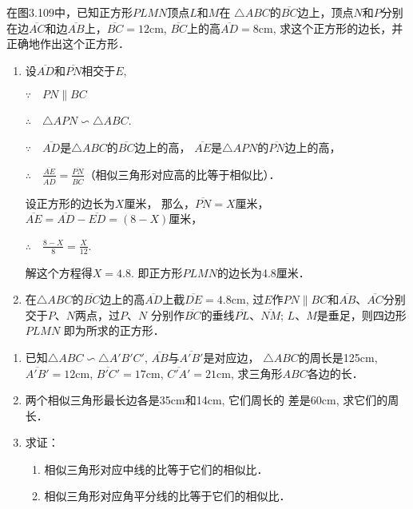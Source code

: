 \begin{example}
    在图3.109中，已知正方形$PLMN$顶点$L$和$M$在
    $\triangle ABC$的$\overline{BC}$边上，顶点$N$和$P$分别在边$\overline{AC}$和边$\overline{AB}$上，$\overline{BC}=12$cm, $\overline{BC}$上的高$\overline{AD}=8$cm, 
    求这个正方形的边长，并正确地作出这个正方形．
\end{example}

\begin{solution}
\begin{enumerate}
    \item 设$\overline{AD}$和$\overline{PN}$相交于$E$,

$\because\quad PN\parallel BC$

$\therefore\quad \triangle APN\backsim \triangle ABC$.

$\because\quad \overline{AD}$是$\triangle ABC$的$\overline{BC}$边上的高，
$\overline{AE}$是$\triangle APN$的$\overline{PN}$边上的高，

$\therefore\quad \frac{\overline{AE}}{\overline{AD}}=\frac{\overline{PN}}{\overline{BC}}$（相似三角形对应高的比等于相似比）．

设正方形的边长为$X$厘米，
那么，$\overline{PN}=X$厘米，$\overline{AE}=\overline{AD}-\overline{ED}=(8-X)$厘米，

$\therefore\quad \frac{8-X}{8}=\frac{X}{12}$.

解这个方程得$X=4.8$. 即正方形$PLMN$的边长为4.8厘米．
\item 在$\triangle ABC$的$\overline{BC}$边上的高$\overline{AD}$上截$\overline{DE}=4.8$cm, 
过$E$作$PN\parallel BC$和$\overline{AB}$、$\overline{AC}$分别交于$P$、$N$两点，过$P$、$N$
分别作$\overline{BC}$的垂线$\overline{PL}$、$\overline{NM}$; $L$、$M$是垂足，则四边形$PLMN$
即为所求的正方形．
\end{enumerate}
\end{solution}

\begin{ex}
\begin{enumerate}
    \item 已知$\triangle ABC\backsim \triangle A'B'C'$, $\overline{AB}$与$\overline{A'B'}$是对应边，
    $\triangle ABC$的周长是125cm, $\overline{A'B'}=12$cm, $\overline{B'C'}=17$cm,  
    $\overline{C'A'}=21$cm, 
求三角形$ABC$各边的长．
\item 两个相似三角形最长边各是35cm和14cm, 它们周长的
差是60cm, 求它们的周长．
\item 求证：
\begin{enumerate}
    \item 相似三角形对应中线的比等于它们的相似比．
    \item 相似三角形对应角平分线的比等于它们的相似比．
\end{enumerate}
\end{enumerate}
\end{ex}
    
